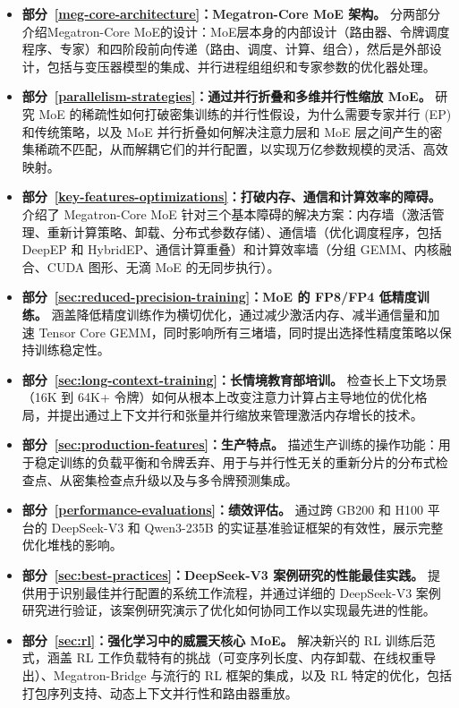 \begin{itemize}

\item \textbf{部分~\ref{meg-core-architecture}：Megatron-Core MoE 架构。}
分两部分介绍Megatron-Core MoE的设计：MoE层本身的内部设计（路由器、令牌调度程序、专家）和四阶段前向传递（路由、调度、计算、组合），然后是外部设计，包括与变压器模型的集成、并行进程组组织和专家参数的优化器处理。

\item \textbf{部分~\ref{parallelism-strategies}：通过并行折叠和多维并行性缩放 MoE。}
研究 MoE 的稀疏性如何打破密集训练的并行性假设，为什么需要专家并行 (EP) 和传统策略，以及 MoE 并行折叠如何解决注意力层和 MoE 层之间产生的密集稀疏不匹配，从而解耦它们的并行配置，以实现万亿参数规模的灵活、高效映射。

\item \textbf{部分~\ref{key-features-optimizations}：打破内存、通信和计算效率的障碍。}
介绍了 Megatron-Core MoE 针对三个基本障碍的解决方案：内存墙（激活管理、重新计算策略、卸载、分布式参数存储）、通信墙（优化调度程序，包括 DeepEP 和 HybridEP、通信计算重叠）和计算效率墙（分组 GEMM、内核融合、CUDA 图形、无滴 MoE 的无同步执行）。

\item \textbf{部分~\ref{sec:reduced-precision-training}：MoE 的 FP8/FP4 低精度训练。}
涵盖降低精度训练作为横切优化，通过减少激活内存、减半通信量和加速 Tensor Core GEMM，同时影响所有三堵墙，同时提出选择性精度策略以保持训练稳定性。

\item \textbf{部分~\ref{sec:long-context-training}：长情境教育部培训。}
检查长上下文场景（16K 到 64K+ 令牌）如何从根本上改变注意力计算占主导地位的优化格局，并提出通过上下文并行和张量并行缩放来管理激活内存增长的技术。

\item \textbf{部分~\ref{sec:production-features}：生产特点。}
描述生产训练的操作功能：用于稳定训练的负载平衡和令牌丢弃、用于与并行性无关的重新分片的分布式检查点、从密集检查点升级以及与多令牌预测集成。

\item \textbf{部分~\ref{performance-evaluations}：绩效评估。}
通过跨 GB200 和 H100 平台的 DeepSeek-V3 和 Qwen3-235B 的实证基准验证框架的有效性，展示完整优化堆栈的影响。

\item \textbf{部分~\ref{sec:best-practices}：DeepSeek-V3 案例研究的性能最佳实践。}
提供用于识别最佳并行配置的系统工作流程，并通过详细的 DeepSeek-V3 案例研究进行验证，该案例研究演示了优化如何协同工作以实现最先进的性能。

\item \textbf{部分~\ref{sec:rl}：强化学习中的威震天核心 MoE。}
解决新兴的 RL 训练后范式，涵盖 RL 工作负载特有的挑战（可变序列长度、内存卸载、在线权重导出）、Megatron-Bridge 与流行的 RL 框架的集成，以及 RL 特定的优化，包括打包序列支持、动态上下文并行性和路由器重放。

\end{itemize}


